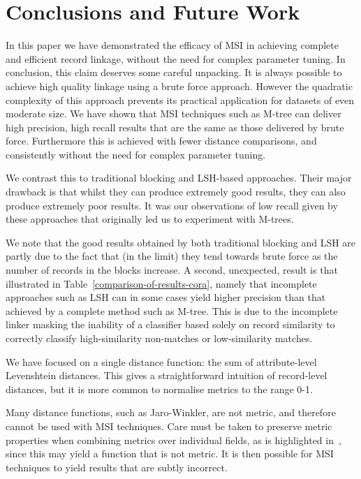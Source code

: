 \documentclass{llncs}
\begin{document}

\section{Conclusions and Future Work\label{sec-concl}}

In this paper we have demonstrated the efficacy of MSI in achieving
complete and efficient record linkage, without the need for complex
parameter tuning. In conclusion, this claim deserves some careful
unpacking. It is always possible to achieve high quality linkage using a
brute force approach. However the quadratic complexity of this approach
prevents its practical application for datasets of even moderate size.
We have shown that MSI techniques such as M-tree can deliver high
precision, high recall results that are the same as those delivered by
brute force. Furthermore this is achieved with fewer distance
comparisons, and consistently without the need for complex parameter
tuning.

We contrast this to traditional blocking and LSH-based approaches. Their
major drawback is that whilst they can produce extremely good results,
they can also produce extremely poor results. It was our observations of
low recall given by these approaches that originally led us to
experiment with M-trees.

We note that the good results obtained by both traditional blocking and
LSH are partly due to the fact that (in the limit) they tend towards
brute force as the number of records in the blocks increase. A second,
unexpected, result is that illustrated in
Table~\ref{comparison-of-results-cora}, namely that incomplete approaches
such as LSH can in some cases yield higher precision than that achieved
by a complete method such as M-tree. This is due to the incomplete
linker masking the inability of a classifier based solely on record
similarity to correctly classify high-similarity non-matches or
low-similarity matches.

We have focused on a single distance function: the sum of
attribute-level Levenshtein distances. This gives a straightforward
intuition of record-level distances, but it is more common to normalise
metrics to the range 0-1.

Many distance functions, such as Jaro-Winkler, are not metric, and
therefore cannot be used with MSI techniques. Care must be taken to
preserve metric properties when combining metrics over individual
fields, as is highlighted in~\cite{Yujian2007}, since this may yield a
function that is not metric. It is then possible for MSI techniques to
yield results that are subtly incorrect.
\end{document}
